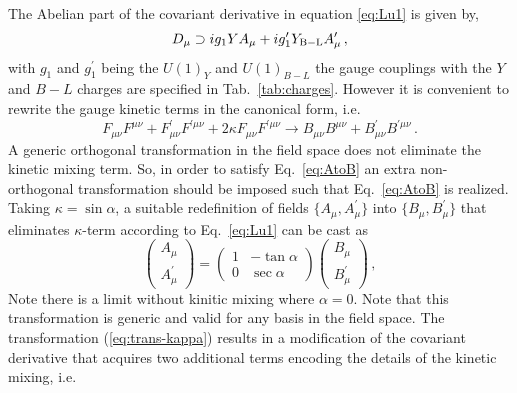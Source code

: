 The Abelian part of the covariant derivative in equation \ref{eq:Lu1} is given by,
\begin{equation}
	D_\mu \supset i g_1 Y A_\mu + i g_1^\prime Y_{\rm B-L} A_\mu^\prime\,,
\end{equation} 
% 
with $g_1$ and $g_1^\prime$ being the $U(1)_{Y}$ and $U(1)_{B-L}$ the gauge couplings with the $Y$ and $B-L$ charges are specified in Tab.~\ref{tab:charges}. However it is convenient to rewrite the gauge kinetic terms in the canonical form, i.e.
%
\begin{equation}
	F_{\mu \nu} F^{\mu \nu} + F^\prime_{\mu \nu} F^{\prime \mu \nu} + 2 \kappa F_{\mu \nu} F^{\prime \mu \nu} \to B_{\mu \nu} B^{\mu \nu} + B^\prime_{\mu \nu} B^{\prime \mu \nu}\,.
	\label{eq:AtoB}
\end{equation}
%
A generic orthogonal transformation in the field space does not eliminate the kinetic mixing term. So, in order to satisfy Eq.~\eqref{eq:AtoB} an extra non-orthogonal transformation should be imposed such that Eq.~\eqref{eq:AtoB} is realized. Taking $\kappa = \sin \alpha$, a suitable redefinition of fields $\{A_\mu,A_\mu^\prime\}$ into $\{B_\mu, B_\mu^\prime\}$ that eliminates $\kappa$-term according to Eq.~\eqref{eq:Lu1} can be cast as
\begin{equation}
	\begin{pmatrix}
	A_\mu \\
	A^\prime_\mu 
	\end{pmatrix}
	=
	\begin{pmatrix}
	1 & -\tan \alpha \\
	0 & \sec \alpha 
	\end{pmatrix}
	\begin{pmatrix}
	B_\mu \\
	B^\prime_\mu 
	\end{pmatrix}\,,
	\label{eq:trans-kappa}
\end{equation}
Note there is a limit without kinitic mixing where $\alpha = 0$. Note that this transformation is generic and valid for any basis in the field space. The transformation (\ref{eq:trans-kappa}) results in a modification of the covariant derivative that acquires two additional terms encoding the details of the kinetic mixing, i.e.

